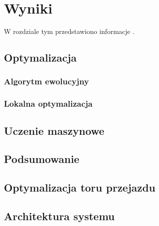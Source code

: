 \chapter{Wyniki}
\label{cha:wyniki}

W rozdziale tym przedstawiono informacje .


\section{Optymalizacja}
\label{sec:optWyniki}

\subsection{Algorytm ewolucyjny}
\label{sec:ewolucyjnyWyniki}

\subsection{Lokalna optymalizacja}
\label{sec:lokalnaWyniki}


\section{Uczenie maszynowe}
\label{sec:uczenieWyniki}


\section{Podsumowanie}
\label{sec:podsumowanieWyniki}



\section{Optymalizacja toru przejazdu}
\label{sec:optymalizacja}


\section{Architektura systemu}
\label{sec:architektura}


